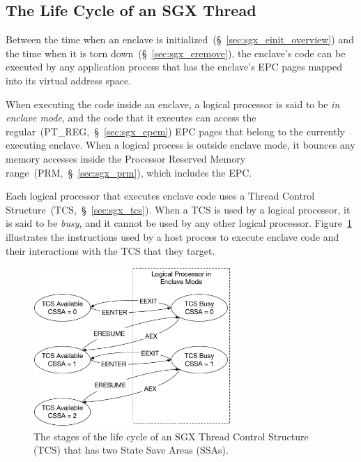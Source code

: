 \subsection{The Life Cycle of an SGX Thread}
\label{sec:sgx_threads}

Between the time when an enclave is
initialized~(\S~\ref{sec:sgx_einit_overview}) and the time when it is torn
down~(\S~\ref{sec:sgx_eremove}), the enclave's code can be executed by any
application process that has the enclave's EPC pages mapped into its virtual
address space.


When executing the code inside an enclave, a logical processor is said to be
\textit{in enclave mode}, and the code that it executes can access the
regular~(PT\_REG,~\S~\ref{sec:sgx_epcm}) EPC pages that belong to the currently
executing enclave. When a logical process is outside enclave mode, it bounces
any memory accesses inside the Processor Reserved Memory
range~(PRM,~\S~\ref{sec:sgx_prm}), which includes the EPC.

Each logical processor that executes enclave code uses a Thread Control
Structure~(TCS,~\S~\ref{sec:sgx_tcs}). When a TCS is used by a logical
processor, it is said to be \textit{busy}, and it cannot be used by any other
logical processor.  Figure~\ref{fig:sgx_tcs_lifecycle} illustrates the
instructions used by a host process to execute enclave code and their
interactions with the TCS that they target.

\begin{figure}[hbt]
  \centering
  \includegraphics[width=75mm]{figures/sgx_tcs_lifecycle.pdf}
  \caption{
    The stages of the life cycle of an SGX Thread Control Structure (TCS) that
    has two State Save Areas (SSAs).
  }
  \label{fig:sgx_tcs_lifecycle}
\end{figure}


